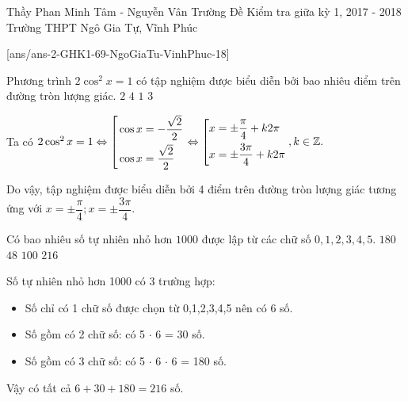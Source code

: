 	\begin{name}
		{Thầy Phan Minh Tâm - Nguyễn Vân Trường}
		{Đề Kiểm tra giữa kỳ 1, 2017 - 2018 Trường THPT Ngô Gia Tự, Vĩnh Phúc }
	\end{name}
	\setcounter{ex}{0}
	[ans/ans-2-GHK1-69-NgoGiaTu-VinhPhuc-18]
\begin{ex}%
Phương trình $ 2 \cos^2x = 1 $ có tập nghiệm được biểu diễn bởi bao nhiêu điểm trên đường tròn lượng giác.
\choice
{$ 2 $}
{\True $ 4 $}
{$ 1 $}
{$ 3 $}
\loigiai
{

Ta có $ 2 \cos^2x = 1 \Leftrightarrow \left[\begin{aligned}&\cos x = -\dfrac{\sqrt{2}}{2}\\&\cos x = \dfrac{\sqrt{2}}{2} \end{aligned}\right. \Leftrightarrow \left[\begin{aligned}&x = \pm \dfrac{\pi}{4} + k 2 \pi \\&x = \pm \dfrac{3\pi}{4} + k 2 \pi  \end{aligned}\right., k \in \mathbb{Z}.$


Do vậy, tập nghiệm được biểu diễn bởi 4 điểm trên đường tròn lượng giác tương ứng với $ x = \pm \dfrac{\pi}{4}; x = \pm \dfrac{3\pi}{4}.  $}

\end{ex}

\begin{ex}%
	Có bao nhiêu số tự nhiên nhỏ hơn $ 1000 $ được lập từ các chữ số $ 0, 1, 2, 3, 4, 5. $
	\choice
	{$ 180 $}
	{$ 48 $}
	{$ 100 $}
	{\True $ 216 $}
\loigiai
{	Số tự nhiên nhỏ hơn 1000 có 3 trường hợp:
	\begin{itemize}
		\item Số chỉ có 1 chữ số được chọn từ {0,1,2,3,4,5} nên có 6 số.
		\item Số gồm có 2 chữ số: có 5 $ \cdot $ 6 = 30 số.
		\item Số gồm có 3 chữ số: có 5 $ \cdot $ 6 $ \cdot $ 6 = 180 số.
	\end{itemize}
Vậy có tất cả $ 6 + 30 + 180 = 216 $ số.
	
}
\end{ex}

